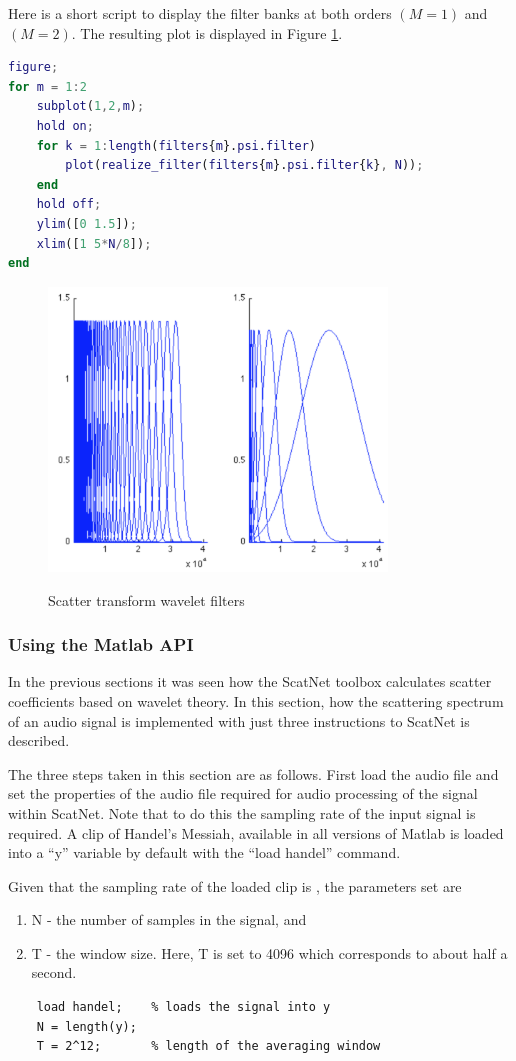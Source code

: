 Here is a short script to display the filter banks at both orders $(M = 1)$ and $(M = 2)$.  The resulting plot is displayed in Figure \ref{fig_c3_wplot}.

\begin{lstlisting}[language=Matlab]
figure;
for m = 1:2
    subplot(1,2,m);
    hold on;
    for k = 1:length(filters{m}.psi.filter)
        plot(realize_filter(filters{m}.psi.filter{k}, N));
    end
    hold off;
    ylim([0 1.5]);
    xlim([1 5*N/8]);
end
\end{lstlisting}

\begin{figure}
\centering
  \includegraphics[width=9cm]{thesis/images/wfplot}\\
  \caption{Scatter transform wavelet filters}\label{fig_c3_wplot}
\end{figure}

\subsubsection{Using the Matlab API}
In the previous sections it was seen how the ScatNet toolbox calculates scatter coefficients based on wavelet theory.  In this section, how the scattering spectrum of an audio signal is implemented with just three instructions to ScatNet is described.

The three steps taken in this section are as follows.  First load the audio file and set the properties of the audio file required for audio processing of the signal within ScatNet.  Note that to do this the sampling rate of the input signal is required.  A clip of Handel’s Messiah, available in all versions of Matlab is loaded into a “y” variable by default with the “load handel” command.

Given that the sampling rate of the loaded clip is , the parameters set are 
\begin{enumerate}
    \item N - the number of samples in the signal, and  
    \item T - the window size.  Here, T is set to 4096 which corresponds to about half a second.
\end{enumerate}
\begin{verbatim}
    load handel;	% loads the signal into y
    N = length(y);
    T = 2^12;   	% length of the averaging window
\end{verbatim}

